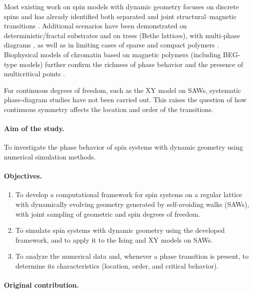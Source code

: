 Most existing work on spin models with dynamic geometry focuses on discrete spins and has already identified both separated and joint structural--magnetic transitions \cite{Garel_1999,PhysRevE.104.024122,faizullina2021critical1}. Additional scenarios have been demonstrated on deterministic/fractal substrates and on trees (Bethe lattices), with multi-phase diagrams \cite{PhysRevE.106.024130,PhysRevE.108.L042502}, as well as in limiting cases of sparse and compact polymers \cite{papalerosa}. Biophysical models of chromatin based on magnetic polymers (including BEG-type models) further confirm the richness of phase behavior and the presence of multicritical points \cite{PhysRevX.6.041047,PhysRevE.100.052410,D5SM00212E}.

For continuous degrees of freedom, such as the XY model on SAWs, systematic phase-diagram studies have not been carried out. This raises the question of how continuous symmetry affects the location and order of the transitions.


\paragraph*{Aim of the study.}

To investigate the phase behavior of spin systems with dynamic geometry using numerical simulation methods.


\paragraph*{Objectives.}

\begin{enumerate}
	\item To develop a computational framework for spin systems on a regular lattice with dynamically evolving geometry generated by self-avoiding walks (SAWs), with joint sampling of geometric and spin degrees of freedom.
	\item To simulate spin systems with dynamic geometry using the developed framework, and to apply it to the Ising and XY models on SAWs.
	\item To analyze the numerical data and, whenever a phase transition is present, to determine its characteristics (location, order, and critical behavior).
\end{enumerate}


\paragraph*{Original contribution.}

